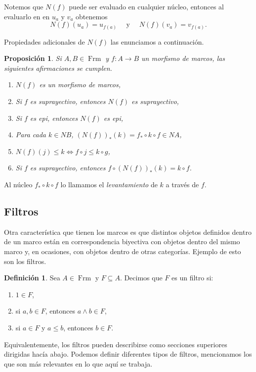 \documentclass[11pt]{amsart}
\DeclareMathOperator{\Frm}{Frm}
\theoremstyle{plain}
\newtheorem{prop}[thm]{Proposición}
\theoremstyle{definition}
\newtheorem{dfn}[thm]{Definición}
\begin{document}
Notemos que $N(f)$ puede ser evaluado en cualquier núcleo, entonces al evaluarlo en 
en $u_a$ y $v_a$ obtenemos
\[
N(f)(u_a)=u_{f(a)}\quad\mbox{ y }\quad N(f)(v_a)=v_{f(a)}.
\]

Propiedades adicionales de $N(f)$ las enunciamos a continuación.

\begin{prop}\label{levantamiento}
Si $A, B\in \Frm$ y $f\colon A\to B$ un morfismo de marcos, las siguientes afirmaciones se cumplen.
\begin{enumerate}
\item $N(f)$ es un morfismo de marcos,
\item Si $f$ es suprayectivo, entonces $N(f)$ es suprayectivo,
\item Si $f$ es epi, entonces $N(f)$ es epi,
\item Para cada $k\in NB$, $(N(f))_*(k)=f_*\circ k\circ f\in NA$,
\item $N(f)(j)\leq k\iff f\circ j\leq k\circ g$,
\item Si $f$ es suprayectivo, entonces $f\circ (N(f))_*(k)=k\circ f$.
\end{enumerate}
\end{prop}

Al núcleo $f_*\circ k\circ f$ lo llamamos el \emph{levantamiento} de $k$ a través de $f$.\\

\subsection{Filtros}
Otra característica que tienen los marcos es que distintos objetos definidos dentro de un marco están en correspondencia biyectiva con objetos dentro del mismo marco 
y, en ocasiones, con objetos dentro de otras categorías. Ejemplo de esto son los filtros.

\begin{dfn}\label{filtros}
Sea $A\in \Frm$ y $F\subseteq A$. Decimos que $F$ es un filtro si:
\begin{enumerate}
\item $1\in F$,
\item si $a, b\in F$, entonces $a\wedge b\in F$,
\item si $a\in F$ y $a\leq b$, entonces $b\in F$.
\end{enumerate}
\end{dfn}

Equivalentemente, los filtros pueden describirse como secciones superiores dirigidas hacía abajo. Podemos definir diferentes tipos de filtros, mencionamos los que son más relevantes en lo que aquí se trabaja.
\end{document}
